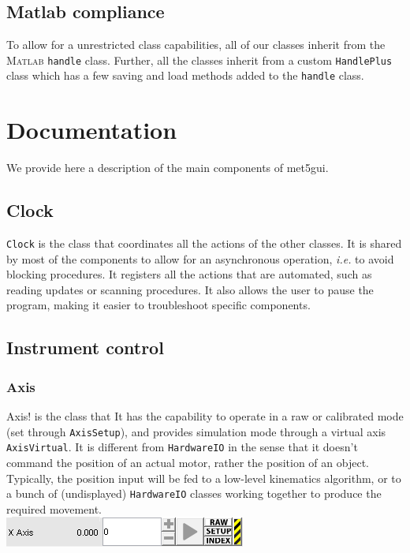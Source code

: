 \documentclass[10pt,letter,twoside]{report}
\begin{document}
\section{Matlab compliance}
To allow for a unrestricted class capabilities, all of our classes inherit from the \textsc{Matlab} \verb!handle! class. 
Further, all the classes inherit from a custom \verb!HandlePlus! class which has a few saving and load methods added to the \verb!handle! class.

\chapter{Documentation}
We provide here a description of the main components of met5gui.

\section{Clock}
\verb!Clock! is the class that coordinates all the actions of the other classes.
It is shared by most of the components to allow for an asynchronous operation, \textit{i.e.} to avoid blocking procedures.
It registers all the actions that are automated, such as reading updates or scanning procedures.
It also allows the user to pause the program, making it easier to troubleshoot specific components.

\section{Instrument control}
\subsection{Axis}
\!Axis! is the class that 
It has the capability to operate in a raw or calibrated mode (set through \verb!AxisSetup!), and provides simulation mode through a virtual axis \verb!AxisVirtual!.
It is different from \verb!HardwareIO! in the sense that it doesn't command the position of an actual motor, rather the position of an object.
Typically, the position input will be fed to a low-level kinematics algorithm, or to a bunch of (undisplayed) \verb!HardwareIO! classes working together to produce the required movement.\\
\includegraphics[scale=1]{img/met5gui-Axis.png}
\end{document}
